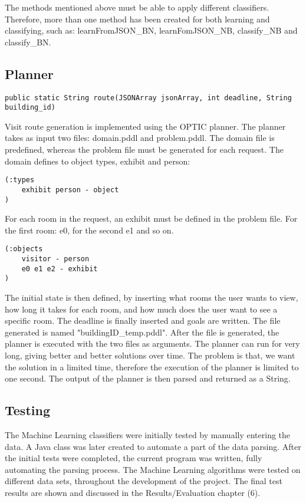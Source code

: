 The methods mentioned above must be able to apply different classifiers. Therefore, more than one method has been created for both learning and classifying, such as: learnFromJSON\_BN, learnFomJSON\_NB, classify\_NB and classify\_BN. 

\subsection{Planner}
\begin{lstlisting}
public static String route(JSONArray jsonArray, int deadline, String building_id)
\end{lstlisting}
Visit route generation is implemented using the OPTIC planner. The planner takes as input two files: domain.pddl and problem.pddl. The domain file is predefined, whereas the problem file must be generated for each request. 
The domain defines to object types, exhibit and person: 
\begin{lstlisting}
(:types
    exhibit person - object
)
\end{lstlisting}
For each room in the request, an exhibit must be defined in the problem file. For the first room: e0, for the second e1 and so on.
\begin{lstlisting}
(:objects
    visitor - person
    e0 e1 e2 - exhibit
)
\end{lstlisting}
The initial state is then defined, by inserting what rooms the user wants to view, how long it takes for each room, and how much does the user want to see a specific room. The deadline is finally inserted and goals are written. The file generated is named "buildingID\_temp.pddl". 
After the file is generated, the planner is executed with the two files as arguments. The planner can run for very long, giving better and better solutions over time. The problem is that, we want the solution in a limited time, therefore the execution of the planner is limited to one second. The output of the planner is then parsed and returned as a String. 

\subsection{Testing}

The Machine Learning classifiers were initially tested by manually entering the data. A Java class was later created to automate a part of the data parsing. After the initial tests were completed, the current program was written, fully automating the parsing process. The Machine Learning algorithms were tested on different data sets, throughout the development of the project. The final test results are shown and discussed in the Results/Evaluation chapter (6). 


